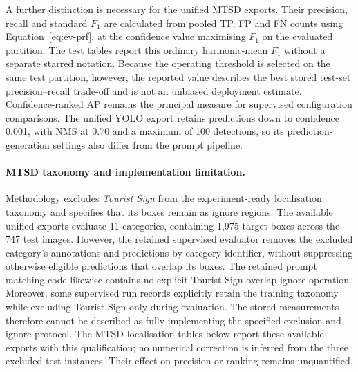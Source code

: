 A further distinction is necessary for the unified \gls{MTSD} exports. Their precision, recall and standard \(F_1\) are calculated from pooled \gls{TP}, \gls{FP} and \gls{FN} counts using Equation~\ref{eq:ev-prf}, at the confidence value maximising \(F_1\) on the evaluated partition. The test tables report this ordinary harmonic-mean \(F_1\) without a separate starred notation. Because the operating threshold is selected on the same test partition, however, the reported value describes the best stored test-set precision--recall trade-off and is not an unbiased deployment estimate. Confidence-ranked \gls{AP} remains the principal measure for supervised configuration comparisons. The unified YOLO export retains predictions down to confidence 0.001, with \gls{NMS} at 0.70 and a maximum of 100 detections, so its prediction-generation settings also differ from the prompt pipeline.

\paragraph{MTSD taxonomy and implementation limitation.}
Methodology excludes \emph{Tourist Sign} from the experiment-ready localisation taxonomy and specifies that its boxes remain as ignore regions. The available unified exports evaluate 11 categories, containing 1,975 target boxes across the 747 test images. However, the retained supervised evaluator removes the excluded category's annotations and predictions by category identifier, without suppressing otherwise eligible predictions that overlap its boxes. The retained prompt matching code likewise contains no explicit Tourist Sign overlap-ignore operation. Moreover, some supervised run records explicitly retain the training taxonomy while excluding Tourist Sign only during evaluation. The stored measurements therefore cannot be described as fully implementing the specified exclusion-and-ignore protocol. The \gls{MTSD} localisation tables below report these available exports with this qualification; no numerical correction is inferred from the three excluded test instances. Their effect on precision or ranking remains unquantified.

